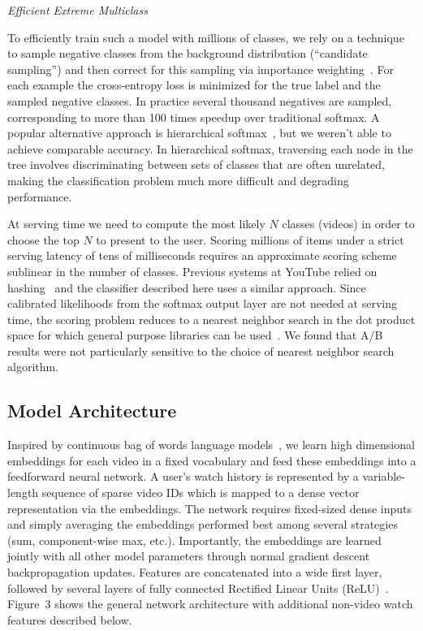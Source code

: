 \textit{Efficient Extreme Multiclass}

To efficiently train such a model with millions of classes, we rely on a
technique to sample negative classes from the background distribution
(``candidate sampling'') and then correct for this sampling via importance
weighting~\cite{jean2014using}. For each example the cross-entropy loss is
minimized for the true label and the sampled negative classes. In practice
several thousand negatives are sampled, corresponding to more than 100 times
speedup over traditional softmax. A popular alternative approach is
hierarchical softmax~\cite{morin2005hierarchical}, but we weren't able to
achieve comparable accuracy. In hierarchical softmax, traversing each node
in the tree involves discriminating between sets of classes that are often
unrelated, making the classification problem much more difficult and
degrading performance.

At serving time we need to compute the most likely $N$ classes (videos) in
order to choose the top $N$ to present to the user. Scoring millions of items
under a strict serving latency of tens of milliseconds requires an
approximate scoring scheme sublinear in the number of classes. Previous
systems at YouTube relied on hashing~\cite{weston2013label} and the
classifier described here uses a similar approach. Since calibrated
likelihoods from the softmax output layer are not needed at serving time, the
scoring problem reduces to a nearest neighbor search in the dot product space
for which general purpose libraries can be used~\cite{liu2004investigation}.
We found that A/B results were not particularly sensitive to the choice of
nearest neighbor search algorithm.

\subsection{Model Architecture}

Inspired by continuous bag of words language models~\cite{mikolov2013distributed},
we learn high dimensional embeddings for each video in a fixed vocabulary and
feed these embeddings into a feedforward neural network. A user's watch
history is represented by a variable-length sequence of sparse video IDs
which is mapped to a dense vector representation via the embeddings. The
network requires fixed-sized dense inputs and simply averaging the embeddings
performed best among several strategies (sum, component-wise max, etc.).
Importantly, the embeddings are learned jointly with all other model
parameters through normal gradient descent backpropagation updates. Features
are concatenated into a wide first layer, followed by several layers of fully
connected Rectified Linear Units (ReLU)~\cite{glorot2011deep}. Figure~3 shows
the general network architecture with additional non-video watch features
described below.

